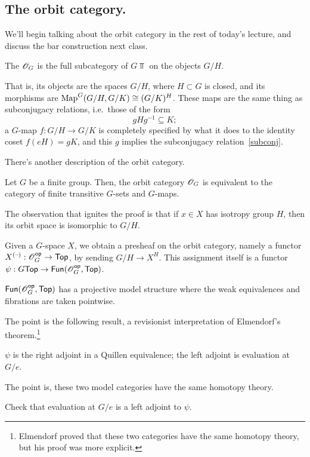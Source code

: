 \subsection*{The orbit category.}
We'll begin talking about the orbit category in the rest of today's lecture, and discuss the bar construction next
class.
\begin{defn}
The  $\mathscr O_G$ is the full subcategory of $G\Top$ on the objects $G/H$.
\end{defn}
That is, its objects are the spaces $G/H$, where $H\subset G$ is closed, and its morphisms are $\operatorname{Map}^G(G/H,
G/K)\cong (G/K)^H$. These maps are the same thing as subconjugacy relations, i.e.\ those of the form
\begin{equation}
\label{subconj}
gHg^{-1}\subseteq K;
\end{equation}
a $G$-map $f:G/H\to G/K$ is completely specified by what it does to the identity coset $f(eH) = gK$, and this $g$
implies the subconjugacy relation~\eqref{subconj}.

There's another description of the orbit category.
\begin{prop}
Let $G$ be a finite group. Then, the orbit category $\mathscr O_G$ is equivalent to the category of finite transitive
$G$-sets and $G$-maps.
\end{prop}
The observation that ignites the proof is that if $x\in X$ has isotropy group $H$, then its orbit space is
isomorphic to $G/H$.
\begin{defn}
Given a $G$-space $X$, we obtain a presheaf on the orbit category, namely a functor $X^{(\text{--})}:\mathscr O_G^{\mathsf{op}}\to\mathsf{Top}$, by
sending $G/H\to X^H$. This assignment itself is a functor $\psi:G\mathsf{Top}\to\mathsf{Fun}(\mathscr O_G^{\mathsf{op}}, \mathsf{Top})$.
\end{defn}
\begin{prop}
$\mathsf{Fun}(\mathscr O_G^{\mathsf{op}}, \mathsf{Top})$ has a projective model structure where the weak equivalences and fibrations are taken
pointwise.
\end{prop}
The point is the following result, a revisionist interpretation of Elmendorf's theorem.\footnote{Elmendorf proved
that these two categories have the same homotopy theory, but his proof was more explicit.}
\begin{thm}
$\psi$ is the right adjoint in a Quillen equivalence; the left adjoint is evaluation at $G/e$.
\end{thm}
The point is, these two model categories have the same homotopy theory.
\begin{ex}
Check that evaluation at $G/e$ is a left adjoint to $\psi$.
\end{ex}
